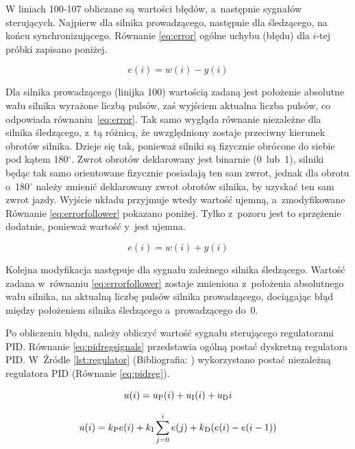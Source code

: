 W liniach 100-107 obliczane są wartości błędów, a~następnie sygnałów sterujących. Najpierw dla silnika prowadzącego, następnie dla śledzącego, na końcu synchronizującego. Równanie \ref{eq:error} ogólne uchybu (błędu) dla $i$-tej próbki zapisano poniżej.

\begin{equation}\label{eq:error}
  e(i)=w(i)-y(i)
\end{equation}

Dla silnika prowadzącego (linijka 100) wartością zadaną jest położenie absolutne wału silnika wyrażone liczbą pulsów, zaś wyjściem aktualna liczba pulsów, co odpowiada równaniu~\ref{eq:error}. Tak samo wygląda równanie niezależne dla silnika śledzącego, z~tą różnicą, że uwzględniony zostaje przeciwny kierunek obrotów silnika. Dzieje się tak, ponieważ silniki są fizycznie obrócone do siebie pod kątem 180$^{\circ}$. Zwrot obrotów deklarowany jest binarnie (0~lub~1), silniki będąc tak samo orientowane fizycznie posiadają ten sam zwrot, jednak dla obrotu o~180$^{\circ}$ należy zmienić deklarowany zwrot obrotów silnika, by uzyskać ten sam zwrot jazdy. Wyjście układu przyjmuje wtedy wartość ujemną, a~zmodyfikowane Równanie \ref{eq:errorfollower} pokazano poniżej. Tylko z~pozoru jest to sprzężenie dodatnie, ponieważ wartość y~jest ujemna.

\begin{equation}\label{eq:errorfollower}
  e(i)=w(i)+y(i)
\end{equation}

Kolejna modyfikacja następuje dla sygnału zależnego silnika śledzącego. Wartość zadana w~równaniu \ref{eq:errorfollower} zostaje zmieniona z~położenia absolutnego wału silnika, na aktualną liczbę pulsów silnika prowadzącego, dociągając błąd między położeniem silnika śledzącego a~prowadzącego do~0.

Po obliczeniu błędu, należy obliczyć wartość sygnału sterującego regulatorami PID. Równanie \ref{eq:pidregsignals} przedstawia ogólną postać dyskretną regulatora PID. W~Źródle \ref{lst:regulator} (Bibliografia: \cite{bib:espidfcomponents}\cite{bib:instrukcjalabyuapid}) wykorzystano postać niezależną regulatora PID (Równanie \ref{eq:pidreg}).

\begin{equation}\label{eq:pidregsignals}
  u(i)=u\textsubscript{P}(i)+u\textsubscript{I}(i)+u\textsubscript{D}i
\end{equation}

\begin{equation}\label{eq:pidreg}
  u(i)=k\textsubscript{P}e(i)+k\textsubscript{I}\sum_{j=0}^{i}e(j)+k\textsubscript{D}(e(i)-e(i-1))
\end{equation}

